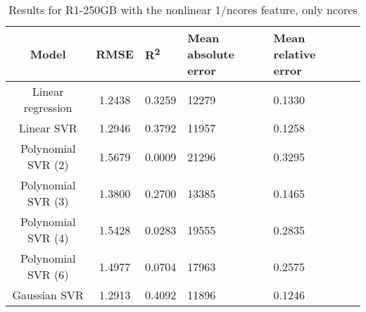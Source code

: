 \begin{table}[H]
\centering
\begin{adjustbox}{center}
\begin{tabular}{c | c M{1.2cm} M{2.5cm} M{2.5cm} M{1.8cm}}
Model & RMSE & R\textsuperscript{2} & Mean absolute error & Mean relative error \tabularnewline
\hline
Linear regression & 1.2438 & 0.3259 &  12279 & 0.1330 \\
Linear SVR & 1.2946 & 0.3792 &  11957 & 0.1258 \\
Polynomial SVR (2) & 1.5679 & 0.0009 &  21296 & 0.3295 \\
Polynomial SVR (3) & 1.3800 & 0.2700 &  13385 & 0.1465 \\
Polynomial SVR (4) & 1.5428 & 0.0283 &  19555 & 0.2835 \\
Polynomial SVR (6) & 1.4977 & 0.0704 &  17963 & 0.2575 \\
Gaussian SVR & 1.2913 & 0.4092 &  11896 & 0.1246 \\
\end{tabular}
\end{adjustbox}
\\
\caption{Results for R1-250GB with the nonlinear 1/ncores feature, only ncores}
\label{tab:all_nonlinear_R1_250}
\end{table}
